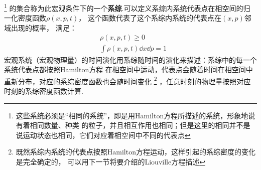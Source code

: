     \footnote{这些系统必须是“相同的系统”，即是用Hamilton方程所描述的系统，形象地说有着相同数量、种类
    的粒子，并且相互作用也相同；但是这里的相同并不是说运动状态也相同，它们对应着相空间中不同的代表点
    }
    的集合称为此宏观条件下的一个\textbf{系综}.可以定义系综内系统代表点在相空间的归一化密度函数$\rho(x, p, t)$，
    这个函数代表了这个系综内系统的代表点在$(x, p)$邻域出现的概率，
    满足：
    \begin{equation}
        \begin{split}
            &\rho(x, p, t) \geq 0\\
            &\int\rho(x, p, t)\dd x\dd p = 1
        \end{split}
        \label{ensemble density}
    \end{equation}
    宏观系统（宏观物理量）的时间演化用系综随时间的演化来描述：系综中的每一个系统代表点都按照Hamilton方程
    在相空间中运动，代表点会随着时间在相空间中重新分布，对应的系综密度函数也会随时间变化
    \footnote{既然系综内系统的代表点按照Hamilton方程运动，这样引起的系综密度的变化是完全确定的，
    可以用下一节将要介绍的Liouville方程描述}
    ，任意时刻的物理量按照对应时刻的系综密度函数计算.
